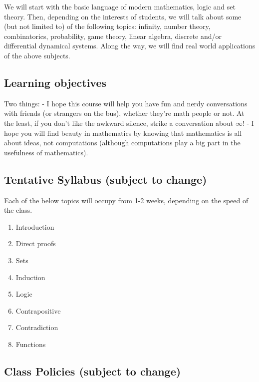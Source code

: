\documentclass[
]{article}
\begin{document}
We will start with the basic language of modern mathematics, logic and set theory.
Then, depending on the interests of students, we will talk about some (but not limited to) of the following topics: infinity, number theory, combinatorics, probability, game theory,
linear algebra, discrete and/or differential dynamical systems.
Along the way, we will find real world applications of the above subjects.

\subsection*{Learning objectives}\label{learning-objectives}

Two things:
- I hope this course will help you have fun and nerdy conversations with friends (or strangers on the bus), whether they're math people or not.
At the least, if you don't like the awkward silence, strike a conversation about \(\infty\)!
- I hope you will find beauty in mathematics by knowing that mathematics is all about ideas,
not computations (although computations play a big part in the usefulness of mathematics).

\subsection*{Tentative Syllabus (subject to change)}\label{tentative-syllabus-subject-to-change}

Each of the below topics will occupy from 1-2 weeks, depending on the speed of the class.

\begin{enumerate}
\def\labelenumi{\arabic{enumi}.}
\item
  Introduction
\item
  Direct proofs
\item
  Sets
\item
  Induction
\item
  Logic
\item
  Contrapositive
\item
  Contradiction
\item
  Functions
\end{enumerate}

\subsection*{Class Policies (subject to change)}\label{class-policies-subject-to-change}
\end{document}
